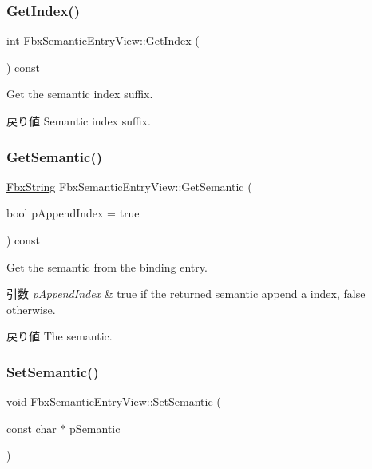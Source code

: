 \subsubsection{\texorpdfstring{Get\+Index()}{GetIndex()}}
{\footnotesize\ttfamily int Fbx\+Semantic\+Entry\+View\+::\+Get\+Index (\begin{DoxyParamCaption}{ }\end{DoxyParamCaption}) const}

Get the semantic index suffix. \begin{DoxyReturn}{戻り値}
Semantic index suffix. 
\end{DoxyReturn}
\mbox{\label{class_fbx_semantic_entry_view_ac1419433cb4547f9cbd42e4855976e43}} 
\subsubsection{\texorpdfstring{Get\+Semantic()}{GetSemantic()}}
{\footnotesize\ttfamily \hyperlink{class_fbx_string}{Fbx\+String} Fbx\+Semantic\+Entry\+View\+::\+Get\+Semantic (\begin{DoxyParamCaption}\item[{bool}]{p\+Append\+Index = {\ttfamily true} }\end{DoxyParamCaption}) const}

Get the semantic from the binding entry. 
\begin{DoxyParams}{引数}
{\em p\+Append\+Index} & {\ttfamily true} if the returned semantic append a index, {\ttfamily false} otherwise. \\
\hline
\end{DoxyParams}
\begin{DoxyReturn}{戻り値}
The semantic. 
\end{DoxyReturn}
\mbox{\label{class_fbx_semantic_entry_view_a602f170055f7dc100360d0d11bb88c56}} 
\subsubsection{\texorpdfstring{Set\+Semantic()}{SetSemantic()}}
{\footnotesize\ttfamily void Fbx\+Semantic\+Entry\+View\+::\+Set\+Semantic (\begin{DoxyParamCaption}\item[{const char $\ast$}]{p\+Semantic }\end{DoxyParamCaption})}

